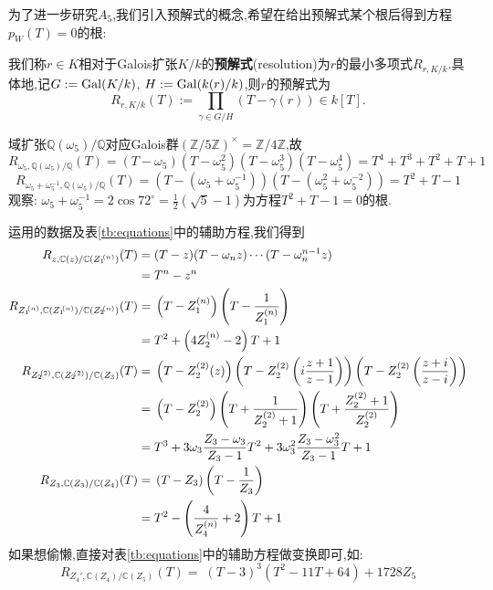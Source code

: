 为了进一步研究$A_5$,我们引入预解式的概念,希望在给出预解式某个根后得到方程$p_W(T)=0$的根:
\begin{defn}
	我们称$r \in K$相对于Galois扩张$K/k$的\textbf{预解式}(resolution)为$r$的最小多项式$R_{r,K/k}$.具体地,记$G:= \operatorname{Gal}(K/k)$, $H:= \operatorname{Gal} (k(r)/k)$,则$r$的预解式为
	$$R_{r,K/k}(T):= \prod_{\gamma \in G/H} (T-\gamma(r)) \in k[T]. $$
\end{defn}
\begin{example1}
	域扩张$\mathbb{Q}(\omega_5)/\mathbb{Q}$对应Galois群$(\mathbb{Z}/5\mathbb{Z})^{\times} =\mathbb{Z}/4\mathbb{Z}$,故
	$$R_{\omega_5, \mathbb{Q}(\omega_5)/\mathbb{Q}} (T)=(T-\omega_5)(T-\omega_5^2)(T-\omega_5^3)(T-\omega_5^4)=T^4+T^3+T^2+T+1$$
	$$R_{\omega_5+\omega_5^{-1}, \mathbb{Q}(\omega_5)/\mathbb{Q}} (T)=\left(T-(\omega_5+\omega_5^{-1})\right)\left(T-(\omega_5^2+\omega_5^{-2})\right)=T^2+T-1$$
	观察: $\omega_5+\omega_5^{-1}=2\cos 72^{\circ} =\frac{1}{2}(\sqrt{5}-1)$为方程$T^2+T-1=0$的根.
\end{example1}
\begin{example1}
	运用\cite[p46-47]{klein2003lectures}的数据及表\ref{tb:equations}中的辅助方程,我们得到
	\begin{equation*}
	\begin{aligned}
	R_{z,\mathbb{C}(z)/\mathbb{C}({Z_1}^{\hspace{-0.18em}(n)})}(T)=\;& (T-z)(T-\omega_{n}z)\cdots (T-\omega_{n}^{n-1}z)\\
	=\;&T^n-z^n\\
	R_{{Z_1}^{\hspace{-0.18em}(n)}, \mathbb{C}({Z_1}^{\hspace{-0.18em}(n)})/\mathbb{C}({Z_2}^{\hspace{-0.18em}(n)})}(T)=\;& \left(T-Z_1^{(n)}\right)\left(T-\frac{1}{Z_1^{(n)}}\right)\\
	=\;&T^2+\left(4Z_2^{(n)}-2\right)T+1\\	R_{{Z_2}^{\hspace{-0.18em}(2)},\mathbb{C}({Z_2}^{\hspace{-0.18em}(2)})/\mathbb{C}(Z_3)}(T)=\;& \left(T-Z_2^{(2)}(z)\right)\left(T-Z_2^{(2)}\left(i\frac{z+1}{z-1}\right)\right)\left(T-Z_2^{(2)}\left(\frac{z+i}{z-i}\right)\right)\\
	=\;& \left(T-Z_2^{(2)}\right)\left(T+\frac{1}{Z_2^{(2)}+1}\right)\left(T+\frac{Z_2^{(2)}+1}{Z_2^{(2)}}\right)\\
	=\;& T^3+3\omega_3 \frac{Z_3-\omega_3}{Z_3-1}T^2+3\omega_3^2 \frac{Z_3-\omega_3^2}{Z_3-1}T+1\\
	R_{Z_3,\mathbb{C}(Z_3)/\mathbb{C}(Z_4)}(T)=\;& \left(T-Z_3\right)\left(T-\frac{1}{Z_3}\right)\\
	=\;&T^2-\left(\frac{4}{Z_4^{(n)}}+2\right)T+1\\
	\end{aligned}
	\end{equation*}
	如果想偷懒,直接对表\ref{tb:equations}中的辅助方程做变换即可,如:
	$$R_{Z_4',\mathbb{C}(Z_4)/\mathbb{C}(Z_5)}(T)=\;(T-3)^3(T^2-11T+64)+1728Z_5 $$
\end{example1}
